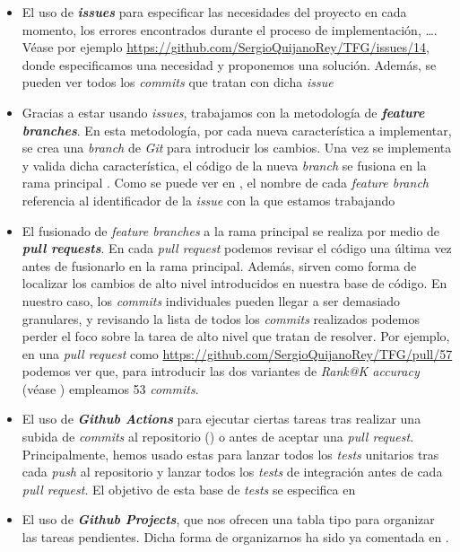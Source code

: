 \begin{itemize}
    \item El uso de \textbf{\textit{issues}} para especificar las necesidades del proyecto en cada momento, los errores encontrados durante el proceso de implementación, \ldots. Véase por ejemplo \url{https://github.com/SergioQuijanoRey/TFG/issues/14}, donde especificamos una necesidad y proponemos una solución. Además, se pueden ver todos los \textit{commits} que tratan con dicha \textit{issue}
    \item Gracias a estar usando \textit{issues}, trabajamos con la metodología de \textbf{\textit{feature branches}}. En esta metodología, por cada nueva característica a implementar, se crea una \textit{branch} de \textit{Git} para introducir los cambios. Una vez se implementa y valida dicha característica, el código de la nueva \textit{branch} se fusiona en la rama principal \cite{informatica:feature_branches}. Como se puede ver en \cite{informatica:repogithub}, el nombre de cada \textit{feature branch} referencia al identificador de la \textit{issue} con la que estamos trabajando
    \item El fusionado de \textit{feature branches} a la rama principal se realiza por medio de \textbf{\textit{pull requests}}. En cada \textit{pull request} podemos revisar el código una última vez antes de fusionarlo en la rama principal. Además, sirven como forma de localizar los cambios de alto nivel introducidos en nuestra base de código. En nuestro caso, los \textit{commits} individuales pueden llegar a ser demasiado granulares, y revisando la lista de todos los \textit{commits} realizados podemos perder el foco sobre la tarea de alto nivel que tratan de resolver. Por ejemplo, en una \textit{pull request} como \url{https://github.com/SergioQuijanoRey/TFG/pull/57} podemos ver que, para introducir las dos variantes de \textit{Rank@K accuracy} (véase ) empleamos 53 \textit{commits}.
    \item El uso de \textbf{\textit{Github Actions}} para ejecutar ciertas tareas tras realizar una subida de \textit{commits} al repositorio () o antes de aceptar una \textit{pull request}. Principalmente, hemos usado estas  para lanzar todos los \textit{tests} unitarios tras cada \textit{push} al repositorio y lanzar todos los \textit{tests} de integración antes de cada \textit{pull request}. El objetivo de esta base de \textit{tests} se especifica en 
    \item El uso de \textbf{\textit{Github Projects}}, que nos ofrecen una tabla tipo  para organizar las tareas pendientes. Dicha forma de organizarnos ha sido ya comentada en .
\end{itemize}

